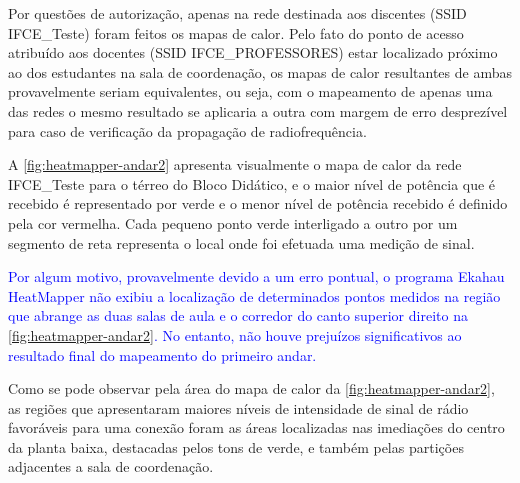 Por questões de autorização, apenas na rede destinada aos discentes (SSID IFCE\_Teste) foram feitos os mapas de calor. Pelo fato do ponto de acesso atribuído aos docentes (SSID IFCE\_PROFESSORES) estar localizado próximo ao dos estudantes na sala de coordenação, os mapas de calor resultantes de ambas provavelmente seriam equivalentes, ou seja,  com o mapeamento de apenas uma das redes o mesmo resultado se aplicaria a outra com margem de erro desprezível para caso de verificação da propagação de radiofrequência.

A \autoref{fig:heatmapper-andar2} apresenta visualmente o mapa de calor da rede IFCE\_Teste para o térreo do Bloco Didático, e o maior nível de potência que é recebido é representado por verde e o menor nível de potência recebido é definido pela cor vermelha. Cada pequeno ponto verde interligado a outro por um segmento de reta representa o local onde foi efetuada uma medição de sinal.

\textcolor{blue}{Por algum motivo, provavelmente devido a um erro pontual, o programa Ekahau HeatMapper não exibiu a localização de determinados pontos medidos na região que abrange as duas salas de aula e o corredor do canto superior direito na \autoref{fig:heatmapper-andar2}. No entanto, não houve prejuízos significativos ao resultado final do mapeamento do primeiro andar.}

\newpage
\begin{figure}[H]
	\centering
\end{figure}

Como se pode observar pela área do mapa de calor da \autoref{fig:heatmapper-andar2}, as regiões que apresentaram maiores níveis de intensidade de sinal de rádio favoráveis para uma conexão foram as áreas localizadas nas imediações do centro da planta baixa, destacadas pelos tons de verde, e também pelas partições adjacentes a sala de coordenação.

